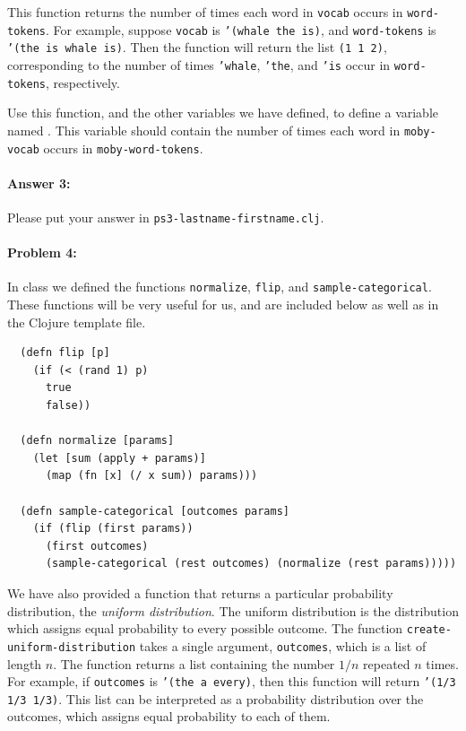 \documentclass[10pt]{article}
\newcommand{\required}[1]{{\color{blue}{#1}}}
\newcommand{\PSnum}{3}
\begin{document}
This function returns the number of times each word in \texttt{vocab} occurs in
\texttt{word-tokens}. For example, suppose \texttt{vocab} is  \texttt{'(whale
the is)}, and \texttt{word-tokens} is  \texttt{'(the is whale is)}.  Then the
function will return the list \texttt{(1 1 2)}, corresponding to the number of
times \texttt{'whale}, \texttt{'the}, and \texttt{'is} occur in
\texttt{word-tokens}, respectively.

Use this function, and the other variables we have
defined, to define a variable named \required{\texttt{moby-word-frequencies}}.
This variable should contain the number of times each word in
\texttt{moby-vocab} occurs in \texttt{moby-word-tokens}.

\paragraph{Answer 3:} Please put your answer in
\texttt{ps\PSnum-lastname-firstname.clj}.

\hrulefill %


\paragraph{Problem 4:}

In class we defined the functions \texttt{normalize}, \texttt{flip}, and
\texttt{sample-categorical}. These functions will be very useful for us, and are
included below as well as in the Clojure template file.

\begin{lstlisting}
  (defn flip [p]
    (if (< (rand 1) p)
      true
      false))

  (defn normalize [params]
    (let [sum (apply + params)]
      (map (fn [x] (/ x sum)) params)))

  (defn sample-categorical [outcomes params]
    (if (flip (first params))
      (first outcomes)
      (sample-categorical (rest outcomes) (normalize (rest params)))))
\end{lstlisting}

We have also provided a function that returns a particular probability
distribution, the \emph{uniform distribution}. The uniform distribution is the
distribution which assigns equal probability to every possible outcome. The
function \texttt{create-uniform-distribution} takes a single argument,
\texttt{outcomes}, which is a list of length $n$. The function returns a list
containing the number $1/n$ repeated $n$ times. For example, if
\texttt{outcomes} is \texttt{'(the a every)}, then this function will return
\texttt{'(1/3 1/3 1/3)}. This list can be interpreted as a probability
distribution over the outcomes, which assigns equal probability to each of them.
\end{document}
